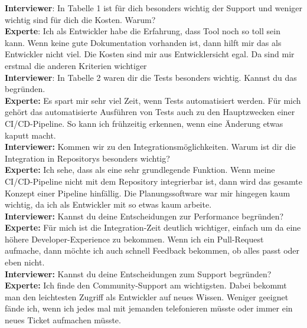 \begin{center}
    \begin{figure}[H]
        \centering
        \label{fig:CEA}
    \end{figure}	
\end{center}
\newpage

\resetlinenumber
\begin{linenumbers}
    \textbf{Interviewer}: In Tabelle 1 ist für dich besonders wichtig der Support und weniger wichtig sind für dich die Kosten. Warum?\\
    \textbf{Experte}: Ich als Entwickler habe die Erfahrung, dass Tool noch so toll sein kann. Wenn keine gute Dokumentation vorhanden ist, dann hilft mir das als Entwickler nicht viel. Die Kosten sind mir aus Entwicklersicht egal. Da sind mir erstmal die anderen Kriterien wichtiger\\
    \textbf{Interviewer}: In Tabelle 2 waren dir die Tests besonders wichtig. Kannst du das begründen.\\
    \textbf{Experte:} Es spart mir sehr viel Zeit, wenn Tests automatisiert werden. Für mich gehört das automatisierte Ausführen von Tests auch zu den Hauptzwecken einer CI/CD-Pipeline. So kann ich frühzeitig erkennen, wenn eine Änderung etwas kaputt macht.\\
    \textbf{Interviewer:} Kommen wir zu den Integrationsmöglichkeiten. Warum ist dir die Integration in Repositorys besonders wichtig?\\
    \textbf{Experte:} Ich sehe, dass als eine sehr grundlegende Funktion. Wenn meine CI/CD-Pipeline nicht mit dem Repository integrierbar ist, dann wird das gesamte Konzept einer Pipeline hinfällig. Die Planungssoftware war mir hingegen kaum wichtig, da ich als Entwickler mit so etwas kaum arbeite.\\
    \textbf{Interviewer:} Kannst du deine Entscheidungen zur Performance begründen?\\
    \textbf{Experte:} Für mich ist die Integration-Zeit deutlich wichtiger, einfach um da eine höhere Developer-Experience zu bekommen. Wenn ich ein Pull-Request aufmache, dann möchte ich auch schnell Feedback bekommen, ob alles passt oder eben nicht.\\
    \textbf{Interviewer:} Kannst du deine Entscheidungen zum Support begründen?\\
    \textbf{Experte:} Ich finde den Community-Support am wichtigsten. Dabei bekommt man den leichtesten Zugriff als Entwickler auf neues Wissen. Weniger geeignet fände ich, wenn ich jedes mal mit jemanden telefonieren müsste oder immer ein neues Ticket aufmachen müsste.

\end{linenumbers}
